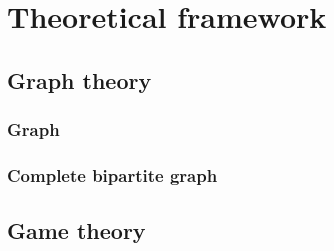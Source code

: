 \section{Theoretical framework}

\subsection{Graph theory}

\subsubsection{Graph}
\subsubsection{Complete bipartite graph}

\subsection{Game theory}


